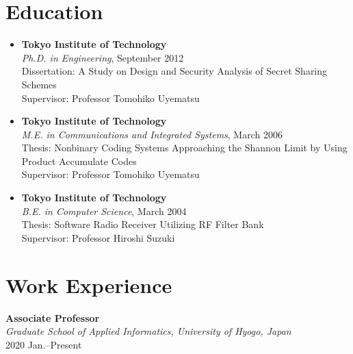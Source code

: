 \section*{Education}

\begin{itemize}
  \item \textbf{Tokyo Institute of Technology}\\
	\hspace*{4ex}\textit{Ph.D. in Engineering}, September 2012\\
	\hspace*{4ex}Dissertation: A Study on Design and Security Analysis of Secret Sharing Schemes\\
	\hspace*{4ex}Supervisor: Professor Tomohiko Uyematsu

  \item \textbf{Tokyo Institute of Technology}\\
	\hspace*{4ex}\textit{M.E. in Communications and Integrated
	Systems}, March 2006\\
	\hspace*{4ex}Thesis: Nonbinary Coding Systems Approaching the Shannon Limit by Using Product Accumulate Codes\\
	\hspace*{4ex}Supervisor: Professor Tomohiko Uyematsu

  \item \textbf{Tokyo Institute of Technology}\\
	\hspace*{4ex}\textit{B.E. in Computer Science}, March 2004\\
	\hspace*{4ex}Thesis: Software Radio Receiver Utilizing RF Filter Bank\\
	\hspace*{4ex}Supervisor: Professor Hiroshi Suzuki
\end{itemize}


\section*{Work Experience}
\textbf{Associate Professor}\\
\hspace*{4ex}\textit{Graduate School of Applied Informatics, University of Hyogo, Japan}\\
\hspace*{4ex}2020 Jan.--Present

